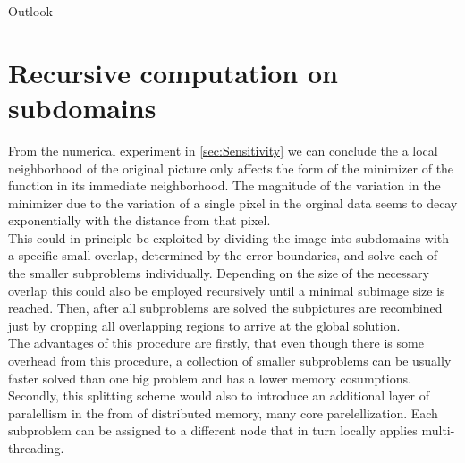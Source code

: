 \begin{chapter}{Outlook}

\section{Recursive computation on subdomains} %
\label{sec:Recursivecomputationonsubdomains}
From the numerical experiment in \ref{sec:Sensitivity} we can conclude the a local neighborhood of the original picture only affects the form of the minimizer of the function
in its immediate neighborhood. The magnitude of the variation in the minimizer due to the variation of a single pixel in the orginal data seems to decay exponentially with the
distance from that pixel. \\

This could in principle be exploited by dividing the image into subdomains with a specific small overlap, determined by the error boundaries, and solve each of the smaller 
subproblems individually. Depending on the size of the necessary overlap this could also be employed recursively until a minimal subimage size is reached. Then, after all subproblems
are solved the subpictures are recombined just by cropping all overlapping regions to arrive at the global solution.\\

The advantages of this procedure are firstly, that even though there is some overhead from this procedure, a collection of smaller subproblems can be usually faster solved than one big
problem and has a lower memory cosumptions. Secondly, this splitting scheme would also to introduce an additional layer of paralellism in the from of distributed memory, many core
parelellization. Each subproblem can be assigned to a different node that in turn locally applies multi-threading.

\end{chapter}
